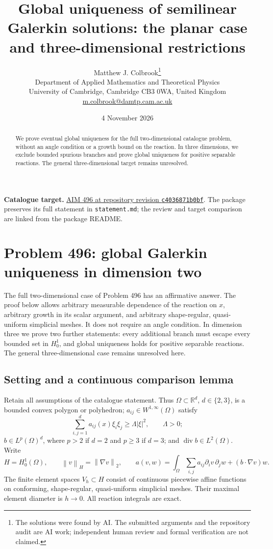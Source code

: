 \documentclass[11pt,a4paper]{article}
\title{Global uniqueness of semilinear Galerkin solutions: the planar case and three-dimensional restrictions}
\author{Matthew J. Colbrook\thanks{The solutions were found by AI. The submitted arguments and the repository audit are AI work; independent human review and formal verification are not claimed.}\\[4pt]
\small Department of Applied Mathematics and Theoretical Physics\\
\small University of Cambridge, Cambridge CB3 0WA, United Kingdom\\
\small\href{mailto:m.colbrook@damtp.cam.ac.uk}{m.colbrook@damtp.cam.ac.uk}}
\date{4 November 2026}
\newcommand{\R}{\mathbb R}
\newcommand{\norm}[1]{\left\lVert#1\right\rVert}
\newcommand{\abs}[1]{\left\lvert#1\right\rvert}
\theoremstyle{definition}
\theoremstyle{remark}
\numberwithin{equation}{section}
\begin{document}
\maketitle
\begin{abstract}
We prove eventual global uniqueness for the full two-dimensional catalogue problem, without an angle condition or a growth bound on the reaction. In three dimensions, we exclude bounded spurious branches and prove global uniqueness for positive separable reactions. The general three-dimensional target remains unresolved.
\end{abstract}
\noindent\textbf{Catalogue target.} \href{https://github.com/MColbrook/AIM/blob/c4036871b0bf15cbc83e79c780b7191bcbb2cfed/problems/496-semilinear-galerkin-global-uniqueness.md}{AIM 496 at repository revision \texttt{c4036871b0bf}}. The package preserves its full statement in \texttt{statement.md}; the review and target comparison are linked from the package README.
\medskip

\section{Problem 496: global Galerkin uniqueness in dimension two}
\label{sec:galerkin}

The full two-dimensional case of Problem 496 has an affirmative answer. The proof below allows arbitrary measurable dependence of the reaction on $x$, arbitrary growth in its scalar argument, and arbitrary shape-regular, quasi-uniform simplicial meshes. It does not require an angle condition. In dimension three we prove two further statements: every additional branch must escape every bounded set in $H_0^1$, and global uniqueness holds for positive separable reactions. The general three-dimensional case remains unresolved here.

\subsection{Setting and a continuous comparison lemma}

Retain all assumptions of the catalogue statement. Thus $\Omega\subset\R^d$, $d\in\{2,3\}$, is a bounded convex polygon or polyhedron; $a_{ij}\in W^{1,\infty}(\Omega)$ satisfy
\[
 \sum_{i,j=1}^d a_{ij}(x)\xi_i\xi_j\ge\Lambda\abs{\xi}^2,
 \qquad \Lambda>0;
\]
$b\in L^p(\Omega)^d$, where $p>2$ if $d=2$ and $p\ge3$ if $d=3$; and $\operatorname{div}b\in L^2(\Omega)$. Write
\[
 H=H_0^1(\Omega),\qquad \norm{v}_H=\norm{\nabla v}_2,
 \qquad
 a(v,w)=\int_\Omega\sum_{i,j}a_{ij}\partial_i v\,\partial_jw
              +(b\cdot\nabla v)w.
\]
The finite element spaces $V_h\subset H$ consist of continuous piecewise affine functions on conforming, shape-regular, quasi-uniform simplicial meshes. Their maximal element diameter is $h\to0$. All reaction integrals are exact.
\end{document}
